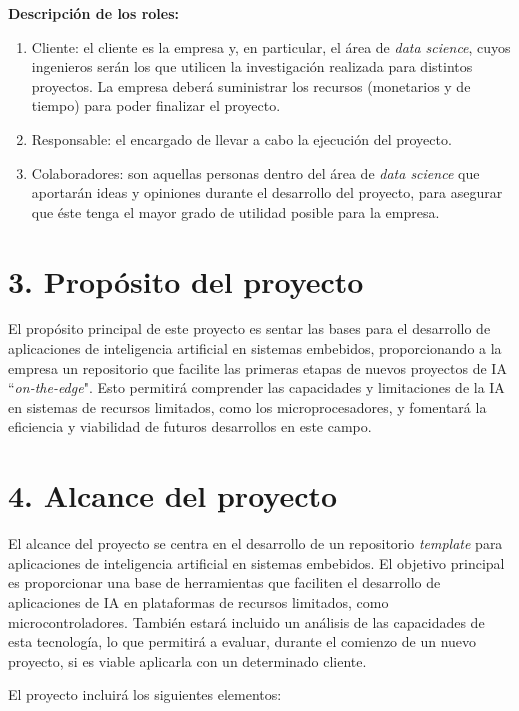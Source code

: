 \documentclass[
11pt, %
codirector, %
]{charter}
\begin{document}
\textbf{Descripción de los roles:}
\begin{enumerate}
\item Cliente: el cliente es la empresa y, en particular, el área de \textit{data science}, cuyos ingenieros serán los que utilicen la investigación realizada para distintos proyectos. La empresa deberá suministrar los recursos (monetarios y de tiempo) para poder finalizar el proyecto. 
\item Responsable: el encargado de llevar a cabo la ejecución del proyecto.
\item Colaboradores: son aquellas personas dentro del área de \textit{data science} que aportarán ideas y opiniones durante el desarrollo del proyecto, para asegurar que éste tenga el mayor grado de utilidad posible para la empresa.
\end{enumerate}


\section{3. Propósito del proyecto}
\label{sec:proposito}

El propósito principal de este proyecto es sentar las bases para el desarrollo de aplicaciones de inteligencia artificial en sistemas embebidos, proporcionando a la empresa un repositorio que facilite las primeras etapas de nuevos proyectos de IA ``\textit{on-the-edge}". Esto permitirá comprender las capacidades y limitaciones de la IA en sistemas de recursos limitados, como los microprocesadores, y fomentará la eficiencia y viabilidad de futuros desarrollos en este campo.

\section{4. Alcance del proyecto}
\label{sec:alcance}

El alcance del proyecto se centra en el desarrollo de un repositorio \textit{template} para aplicaciones de inteligencia artificial en sistemas embebidos. El objetivo principal es proporcionar una base de herramientas que faciliten el desarrollo de aplicaciones de IA en plataformas de recursos limitados, como microcontroladores. También estará incluido un análisis de las capacidades de esta tecnología, lo que permitirá a \empclientename evaluar, durante el comienzo de un nuevo proyecto, si es viable aplicarla con un determinado cliente.

El proyecto incluirá los siguientes elementos:
\end{document}

